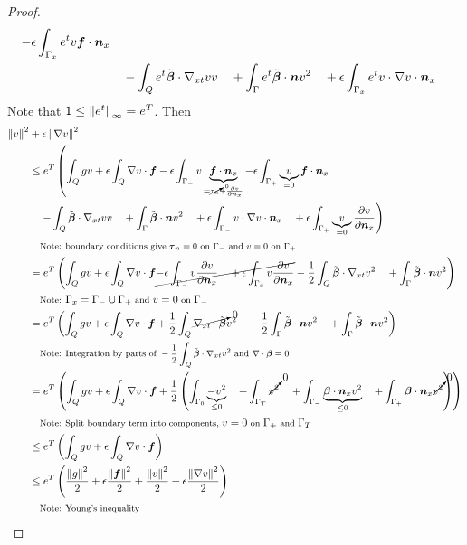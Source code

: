 \documentclass{article}
\theoremstyle{definition}
\theoremstyle{remark}
\begin{document}
\begin{proof}
\begin{align*}
-\epsilon\int_{\Gamma_x}e^{t}v\boldsymbol f\cdot\boldsymbol n_x\\
&\quad-\int_Qe^{t}\tilde{\boldsymbol\beta}\cdot\nabla_{xt} vv
\quad+\int_\Gamma e^{t}\tilde{\boldsymbol\beta}\cdot\boldsymbol n v^2
\quad+\epsilon\int_{\Gamma_x}e^{t}v\cdot\nabla v\cdot\boldsymbol n_x
\end{align*}
Note that $1\leq\left\| e^t \right\|_\infty=e^T$.
Then
\begin{align*}
\left\| v \right\|^2
&+\epsilon\left\| \nabla v \right\|^2
\\
&\leq
e^T\left(
\int_Qgv
+\epsilon\int_Q\nabla v\cdot\boldsymbol f
-\epsilon\int_{\Gamma_-}v\underbrace{\boldsymbol f\cdot\boldsymbol n_x}_{=\cancelto{0}{\tau_n}+\frac{\partial v}{\partial\boldsymbol n_x}}
-\epsilon\int_{\Gamma_+}\underbrace{v}_{=0}\boldsymbol f\cdot\boldsymbol n_x
\right.\\
&\left.
\quad-\int_Q\tilde{\boldsymbol\beta}\cdot\nabla_{xt} vv
\quad+\int_\Gamma \tilde{\boldsymbol\beta}\cdot\boldsymbol n v^2
\quad+\epsilon\int_{\Gamma_-}v\cdot\nabla v\cdot\boldsymbol n_x
\quad+\epsilon\int_{\Gamma_+}\underbrace{v}_{=0}\frac{\partial v}{\partial\boldsymbol n_x}
\right)
\\
&\quad\footnotesize{\text{Note: boundary conditions give }\boldsymbol\tau_n=0\text{ on }\Gamma_-\text{ and }v=0\text{ on }\Gamma_+}
\\
&=
e^T\left(
\int_Qgv
+\epsilon\int_Q\nabla v\cdot\boldsymbol f
\cancel{
-\epsilon\int_{\Gamma_-}v\frac{\partial v}{\partial\boldsymbol n_x}
\quad+\epsilon\int_{\Gamma_x}v\frac{\partial v}{\partial\boldsymbol n_x}
}
-\frac{1}{2}\int_Q\tilde{\boldsymbol\beta}\cdot\nabla_{xt} v^2
\quad+\int_\Gamma \tilde{\boldsymbol\beta}\cdot\boldsymbol n v^2
\right)
\\
&\quad\footnotesize{\text{Note: }\Gamma_x=\Gamma_-\cup\Gamma_+\text{ and }v=0\text{ on }\Gamma_-}
\\
&=
e^T\left(
\int_Qgv
+\epsilon\int_Q\nabla v\cdot\boldsymbol f
+\frac{1}{2}\int_Q\cancelto{0}{\nabla_{xt}\cdot\tilde{\boldsymbol\beta}} v^2
\quad-\frac{1}{2}\int_\Gamma\tilde{\boldsymbol\beta}\cdot\boldsymbol n v^2
\quad+\int_\Gamma \tilde{\boldsymbol\beta}\cdot\boldsymbol n v^2
\right)
\\
&\quad\footnotesize{\text{Note: Integration by parts of }-\frac{1}{2}\int_Q\tilde{\boldsymbol\beta}\cdot\ensuremath{\nabla_{xt}}v^2\text{ and }\ensuremath{\nabla\cdot}\boldsymbol\beta=0} 
\\
&=
e^T\left(
\int_Qgv
+\epsilon\int_Q\nabla v\cdot\boldsymbol f
+\frac{1}{2}\left( \int_{\Gamma_0} \underbrace{-v^2}_{\leq 0}
\quad+\int_{\Gamma_T} \cancelto{0}{v^2}
\quad+\int_{\Gamma_-} \underbrace{\boldsymbol\beta\cdot\boldsymbol n_x v^2}_{\leq 0}
\quad+\int_{\Gamma_+} \boldsymbol\beta\cdot\boldsymbol n_x \cancelto{0}{v^2}
 \right)
\right)
\\
&\quad\footnotesize{\text{Note: Split boundary term into components, }v=0\text{ on }\Gamma_+\text{ and }\Gamma_T} 
\\
&\leq
e^T\left(
\int_Qgv
+\epsilon\int_Q\nabla v\cdot\boldsymbol f
\right)
\\
&\leq
e^T\left(
\frac{\left\| g \right\|^2}{2}
+\epsilon\frac{\left\| \boldsymbol f \right\|^2}{2}
+\frac{\left\| v \right\|^2}{2}
+\epsilon\frac{\left\| \nabla v \right\|^2}{2}
\right)
\\
&\quad\footnotesize{\text{Note: Young's inequality}}
\end{align*}
\end{proof}
\end{document}

